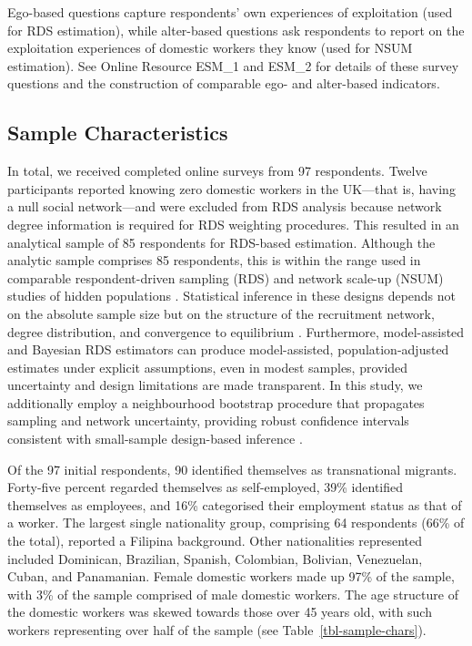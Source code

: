 \documentclass[
  12pt,
  letterpaper,
  DIV=11,
  numbers=noendperiod]{scrartcl}
\begin{document}
Ego-based questions capture respondents' own experiences of exploitation
(used for RDS estimation), while alter-based questions ask respondents
to report on the exploitation experiences of domestic workers they know
(used for NSUM estimation). See Online Resource ESM\_1 and ESM\_2 for
details of these survey questions and the construction of comparable
ego- and alter-based indicators.

\subsection{Sample Characteristics}\label{sec-sample-characteristics}

In total, we received completed online surveys from 97 respondents.
Twelve participants reported knowing zero domestic workers in the
UK---that is, having a null social network---and were excluded from RDS
analysis because network degree information is required for RDS
weighting procedures. This resulted in an analytical sample of 85
respondents for RDS-based estimation. Although the analytic sample
comprises 85 respondents, this is within the range used in comparable
respondent-driven sampling (RDS) and network scale-up (NSUM) studies of
hidden populations
\autocite{gile10-respondentdriven,goel10-assessing,gile11-improved}.
Statistical inference in these designs depends not on the absolute
sample size but on the structure of the recruitment network, degree
distribution, and convergence to equilibrium \autocite{salg04-sampling}.
Furthermore, model-assisted and Bayesian RDS estimators
\autocite{gile11-improved,gile18-methods} can produce model-assisted,
population-adjusted estimates under explicit assumptions, even in modest
samples, provided uncertainty and design limitations are made
transparent. In this study, we additionally employ a neighbourhood
bootstrap procedure that propagates sampling and network uncertainty,
providing robust confidence intervals consistent with small-sample
design-based inference \autocite{hand14-estimating}.

Of the 97 initial respondents, 90 identified themselves as transnational
migrants. Forty-five percent regarded themselves as self-employed, 39\%
identified themselves as employees, and 16\% categorised their
employment status as that of a worker. The largest single nationality
group, comprising 64 respondents (66\% of the total), reported a
Filipina background. Other nationalities represented included Dominican,
Brazilian, Spanish, Colombian, Bolivian, Venezuelan, Cuban, and
Panamanian. Female domestic workers made up 97\% of the sample, with 3\%
of the sample comprised of male domestic workers. The age structure of
the domestic workers was skewed towards those over 45 years old, with
such workers representing over half of the sample (see
Table~\ref{tbl-sample-chars}).
\end{document}
